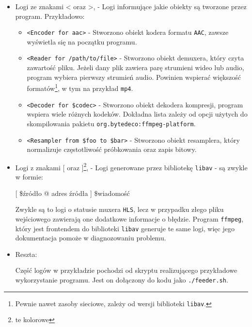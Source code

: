 \documentclass[a4paper,12pt]{article}
\begin{document}
\begin{itemize}
        \item Logi ze znakami < oraz >, - Logi informujące jakie obiekty są
            tworzone przez program. Przykładowo:
            \begin{itemize}
                \item \texttt{<Encoder for aac>} - Stworzono obiekt kodera
                    formatu \texttt{AAC}, zawsze wyświetla się na początku
                    programu.
                \item \texttt{<Reader for /path/to/file>} - Stworzono obiekt
                    demuxera, który czyta zawartość pliku. Jeżeli dany plik
                    zawiera parę strumieni wideo lub audio, program wybiera
                    pierwszy strumień audio. Powinien wspierać większość
                    formatów\footnote{Pewnie nawet zasoby sieciowe, zależy od wersji
                    biblioteki \texttt{libav}.}, w tym na przykład
                    \texttt{mp4}.
                \item \texttt{<Decoder for \$codec>} - Stworzono obiekt dekodera
                    kompresji, program wspiera wiele różnych kodeków. Dokładna
                    lista zależy od opcji użytych do skompilowania pakietu
                    \texttt{org.bytedeco:ffmpeg-platform}.
                \item \texttt{<Resampler from \$foo to \$bar>} - Stworzono
                    obiekt resamplera, który normalizuje częstotliwość
                    próbkowania oraz zapis bitowy.
            \end{itemize}
        \item Logi z znakami [ oraz ]\footnote{te kolorowe}, - Logi generowane przez bibliotekę
            \texttt{libav} - są zwykle w formie:

            \begin{center}
                [ \$źródło @ adres źródła ] \$wiadomość
            \end{center}
            
            Zwykle są to logi o statusie muxera \texttt{HLS}, lecz w przypadku
            złego pliku wejściowego zawierają one dodatkowe informacje o
            błędzie. Program \texttt{ffmpeg}, który jest frontendem do
            biblioteki \texttt{libav} generuje te same logi, więc jego
            dokumentacja pomoże w diagnozowaniu problemu.

        \item Reszta:

            Część logów w przykładzie pochodzi od skryptu realizującego
            przykładowe wykorzystanie programu. Jest on dołączony do kodu jako
            \texttt{./feeder.sh}.
\end{itemize}
\end{document}
